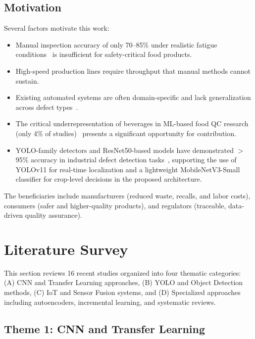 \documentclass{ieeeaccess}
\begin{document}
\subsection{Motivation}
Several factors motivate this work:
\begin{itemize}
    \item Manual inspection accuracy of only 70--85\% under realistic fatigue conditions~\cite{thermoforming2021} is insufficient for safety-critical food products.
    \item High-speed production lines require throughput that manual methods cannot sustain.
    \item Existing automated systems are often domain-specific and lack generalization across defect types~\cite{cvpackaging2024}.
    \item The critical underrepresentation of beverages in ML-based food QC research (only 4\% of studies)~\cite{mlreview2025} presents a significant opportunity for contribution.
    \item YOLO-family detectors and ResNet50-based models have demonstrated $>$95\% accuracy in industrial defect detection tasks~\cite{resnet50defect2025, defectdetection2024}, supporting the use of YOLOv11 for real-time localization and a lightweight MobileNetV3-Small classifier for crop-level decisions in the proposed architecture.
\end{itemize}

The beneficiaries include manufacturers (reduced waste, recalls, and labor costs), consumers (safer and higher-quality products), and regulators (traceable, data-driven quality assurance).


\section{Literature Survey}
\label{sec:literature}
This section reviews 16 recent studies organized into four thematic categories: (A) CNN and Transfer Learning approaches, (B) YOLO and Object Detection methods, (C) IoT and Sensor Fusion systems, and (D) Specialized approaches including autoencoders, incremental learning, and systematic reviews.

\subsection{Theme 1: CNN and Transfer Learning}
\end{document}
